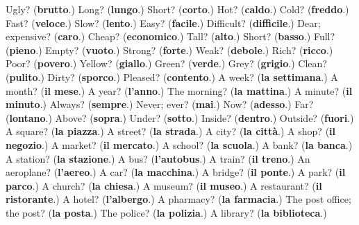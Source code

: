 \begin{tcolorbox}[breakable,colback=teal!4,colframe=teal!35!black,title={Before you move on}]
Ugly? (\textbf{brutto}.) Long? (\textbf{lungo}.) Short? (\textbf{corto}.) Hot? (\textbf{caldo}.) Cold? (\textbf{freddo}.) Fast? (\textbf{veloce}.) Slow? (\textbf{lento}.) Easy? (\textbf{facile}.) Difficult? (\textbf{difficile}.) Dear; expensive? (\textbf{caro}.) Cheap? (\textbf{economico}.) Tall? (\textbf{alto}.) Short? (\textbf{basso}.) Full? (\textbf{pieno}.) Empty? (\textbf{vuoto}.) Strong? (\textbf{forte}.) Weak? (\textbf{debole}.) Rich? (\textbf{ricco}.) Poor? (\textbf{povero}.) Yellow? (\textbf{giallo}.) Green? (\textbf{verde}.) Grey? (\textbf{grigio}.) Clean? (\textbf{pulito}.) Dirty? (\textbf{sporco}.) Pleased? (\textbf{contento}.) A week? (\textbf{la settimana}.) A month? (\textbf{il mese}.) A year? (\textbf{l'anno}.) The morning? (\textbf{la mattina}.) A minute? (\textbf{il minuto}.) Always? (\textbf{sempre}.) Never; ever? (\textbf{mai}.) Now? (\textbf{adesso}.) Far? (\textbf{lontano}.) Above? (\textbf{sopra}.) Under? (\textbf{sotto}.) Inside? (\textbf{dentro}.) Outside? (\textbf{fuori}.) A square? (\textbf{la piazza}.) A street? (\textbf{la strada}.) A city? (\textbf{la città}.) A shop? (\textbf{il negozio}.) A market? (\textbf{il mercato}.) A school? (\textbf{la scuola}.) A bank? (\textbf{la banca}.) A station? (\textbf{la stazione}.) A bus? (\textbf{l'autobus}.) A train? (\textbf{il treno}.) An aeroplane? (\textbf{l'aereo}.) A car? (\textbf{la macchina}.) A bridge? (\textbf{il ponte}.) A park? (\textbf{il parco}.) A church? (\textbf{la chiesa}.) A museum? (\textbf{il museo}.) A restaurant? (\textbf{il ristorante}.) A hotel? (\textbf{l'albergo}.) A pharmacy? (\textbf{la farmacia}.) The post office; the post? (\textbf{la posta}.) The police? (\textbf{la polizia}.) A library? (\textbf{la biblioteca}.)
\end{tcolorbox}
